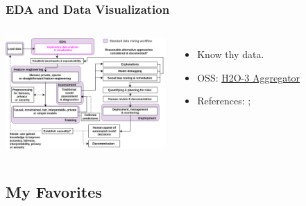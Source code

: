 \documentclass[11pt,
               aspectratio=169,
               hyperref={colorlinks}
               ]{beamer}
\begin{document}
		\begin{frame}
		
			\frametitle{EDA and Data Visualization}		
			
			\begin{columns}
	
				\centering
				\includegraphics[height=120pt]{../img/eda.png}
				
				\vspace{-5pt}
				\begin{itemize}
					\item Know thy data.
					\item OSS: \href{http://docs.h2o.ai/h2o/latest-stable/h2o-docs/data-science/aggregator.html}{H2O-3 Aggregator}
					\item References: ; 
				\end{itemize}
				
			\end{columns}
		
		\end{frame}
		
		\subsection{My Favorites}
		
\end{document}
